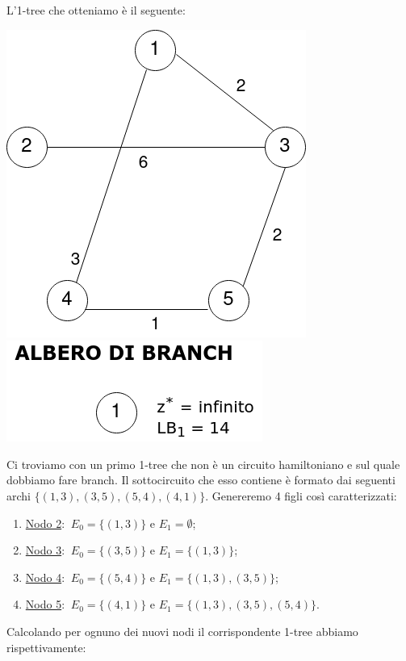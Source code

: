 \documentclass[
    article,            %
    12pt,                %
    oneside,            %
    a4paper,            %
    english,            %
    italian,                %
    sumario=tradicional,
]{abntex2}
\begin{document}
    L'1-tree che otteniamo è il seguente:
    \begin{center}
        \includegraphics[scale=0.33]{files/primo1Tree}
        \qquad \qquad \qquad
        \includegraphics[scale=0.4]{files/alberoBranch1}
    \end{center}
    Ci troviamo con un primo 1-tree che non è un circuito hamiltoniano e sul quale dobbiamo fare branch.
    Il sottocircuito che esso contiene è formato dai seguenti archi $\{(1,3),(3,5),(5,4),(4,1)\}$.
    Genereremo 4 figli così caratterizzati:
    \begin{enumerate}
        \item [] \underline{Nodo 2}: $\:E_0 = \{(1,3)\}$ e $E_1 = \emptyset$;
        \item [] \underline{Nodo 3}: $\:E_0 = \{(3,5)\}$ e $E_1 = \{(1,3)\}$;
        \item [] \underline{Nodo 4}: $\:E_0 = \{(5,4)\}$ e $E_1 = \{(1,3),(3,5)\}$;
        \item [] \underline{Nodo 5}: $\:E_0 = \{(4,1)\}$ e $E_1 = \{(1,3),(3,5),(5,4)\}$.
    \end{enumerate}
    Calcolando per ognuno dei nuovi nodi il corrispondente 1-tree abbiamo rispettivamente:
\end{document}

